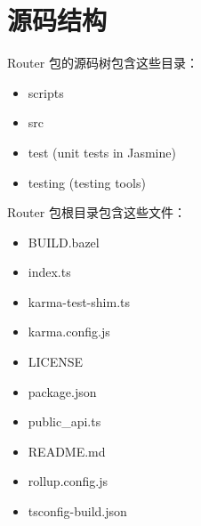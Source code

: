\section{源码结构}


Router 包的源码树包含这些目录：

\begin{itemize}
  \item scripts
  \item src
  \item test (unit tests in Jasmine)
  \item testing (testing tools)
\end{itemize}


Router 包根目录包含这些文件：

\begin{itemize}
  \item BUILD.bazel
  \item index.ts
  \item karma-test-shim.ts
  \item karma.config.js
  \item LICENSE
  \item package.json
  \item public\_api.ts
  \item README.md
  \item rollup.config.js
  \item tsconfig-build.json
\end{itemize}
